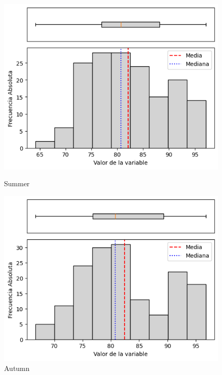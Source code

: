 \begin{figure}[H]
\centering
\begin{minipage}{0.30\textwidth}
  \includegraphics[width=\linewidth]{resultados/por_estacion_del_anio/boxplot_clases_por_estacion/Andahuaylas/RH_HistBoxplot_Summer.png}
  \caption*{Summer}
\end{minipage}
\hfill
\begin{minipage}{0.30\textwidth}
  \includegraphics[width=\linewidth]{resultados/por_estacion_del_anio/boxplot_clases_por_estacion/Andahuaylas/RH_HistBoxplot_Autumn.png}
  \caption*{Autumn}
\end{minipage}

\vspace{0.2cm}


\end{figure}

